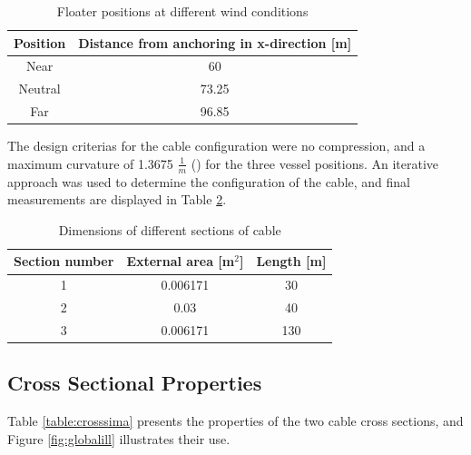 \begin{table} [H]
\centering
\begin{tabular}{ |c|c|}
\hline
Position & Distance from anchoring in x-direction [m] \\
 \hline
 \hline
 
Near & 60\\

Neutral & 73.25\\

Far & 96.85 \\
 
 \hline
\end{tabular}
\caption{Floater positions at different wind conditions}
\label{table:pos}
\end{table}

The design criterias for the cable configuration were no compression, and a maximum curvature of 1.3675 $\frac{1}{m}$ (\cite{API2014}) for the three vessel positions. An iterative approach was used to determine the configuration of the cable, and final measurements are displayed in Table \ref{table:DIMCABLE}.
\begin{table} [H]
\centering
\begin{tabular}{ |c|c|c|}
\hline
Section number & External area [m$^2$] & Length [m] \\
 \hline
 \hline
1 & 0.006171 & 30\\
2 & 0.03 & 40\\
3 & 0.006171 & 130\\
 \hline
\end{tabular}
\caption{Dimensions of different sections of cable}
\label{table:DIMCABLE}
\end{table}

\subsection{Cross Sectional Properties}
 Table \ref{table:crosssima} presents the properties of the two cable cross sections, and Figure \ref{fig:globalill} illustrates their use.

